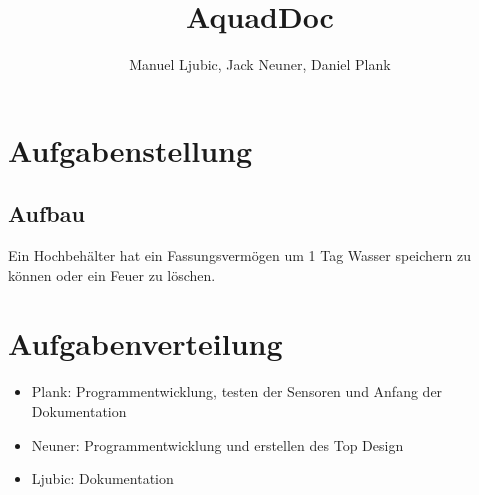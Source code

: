 \documentclass[12pt,a4paper]{article}
\author{Manuel Ljubic, Jack Neuner, Daniel Plank}
\title{AquadDoc}
\begin{document}
\begin{titlepage}
\begin{center}
\setlength{\fboxrule}{1mm}
\break
\vspace{1mm}
\setlength{\fboxrule}{.1mm}

\end{center}
\end{titlepage}

\tableofcontents
\newpage

\section{Aufgabenstellung}

\subsection{Aufbau}
\begin{figure}[H]
	\centering
	\def\svgwidth{\columnwidth}
	

	\label{fig:schemaufb}
	

\end{figure}

Ein Hochbehälter hat ein Fassungsvermögen um 1 Tag Wasser speichern zu können
oder ein Feuer zu löschen.
\section{Aufgabenverteilung}
\begin{itemize}
  \item{Plank: Programmentwicklung, testen der Sensoren und Anfang der Dokumentation}

  \item{Neuner: Programmentwicklung und erstellen des Top Design}

  \item{Ljubic: Dokumentation}
\end{itemize}
\end{document}
